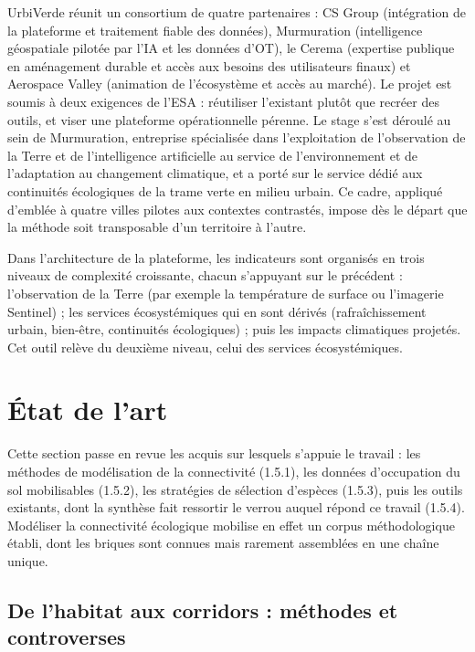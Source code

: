 \documentclass[a4paper,11pt]{report}
\begin{document}
UrbiVerde réunit un consortium de quatre partenaires : CS Group (intégration de la plateforme et traitement fiable des données), Murmuration (intelligence géospatiale pilotée par l'IA et les données d'OT), le Cerema (expertise publique en aménagement durable et accès aux besoins des utilisateurs finaux) et Aerospace Valley (animation de l'écosystème et accès au marché). Le projet est soumis à deux exigences de l'ESA : réutiliser l'existant plutôt que recréer des outils, et viser une plateforme opérationnelle pérenne. Le stage s'est déroulé au sein de Murmuration, entreprise spécialisée dans l'exploitation de l'observation de la Terre et de l'intelligence artificielle au service de l'environnement et de l'adaptation au changement climatique, et a porté sur le service dédié aux continuités écologiques de la trame verte en milieu urbain. Ce cadre, appliqué d'emblée à quatre villes pilotes aux contextes contrastés, impose dès le départ que la méthode soit transposable d'un territoire à l'autre.

Dans l'architecture de la plateforme, les indicateurs sont organisés en trois niveaux de complexité croissante, chacun s'appuyant sur le précédent : l'observation de la Terre (par exemple la température de surface ou l'imagerie Sentinel) ; les services écosystémiques qui en sont dérivés (rafraîchissement urbain, bien-être, continuités écologiques) ; puis les impacts climatiques projetés. Cet outil relève du deuxième niveau, celui des services écosystémiques.

\section{État de l'art}\label{sec:1.5}

Cette section passe en revue les acquis sur lesquels s'appuie le travail : les méthodes de modélisation de la connectivité (1.5.1), les données d'occupation du sol mobilisables (1.5.2), les stratégies de sélection d'espèces (1.5.3), puis les outils existants, dont la synthèse fait ressortir le verrou auquel répond ce travail (1.5.4). Modéliser la connectivité écologique mobilise en effet un corpus méthodologique établi, dont les briques sont connues mais rarement assemblées en une chaîne unique.

\subsection{De l'habitat aux corridors : méthodes et controverses}\label{sec:1.5.1}
\end{document}
